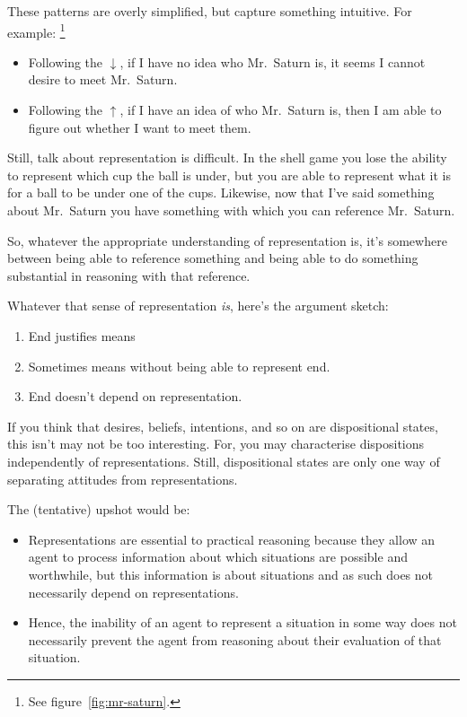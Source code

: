 \documentclass[10pt]{article}
\newcommand{\hozlinedash}[0]{%
  \noindent\hdashrule[0.5ex][c]{\textwidth}{.1pt}{2.5pt}
}
\begin{document}
These patterns are overly simplified, but capture something intuitive.
For example:\nolinebreak
\footnote{See figure~\ref{fig:mr-saturn}.}
\begin{itemize}
\item Following the \(\downarrow\), if I have no idea who Mr.\ Saturn is, it seems I cannot desire to meet Mr.\ Saturn.
\item Following the \(\uparrow\), if I have an idea of who Mr.\ Saturn is, then I am able to figure out whether I want to meet them.
\end{itemize}

Still, talk about representation is difficult.
In the shell game you lose the ability to represent which cup the ball is under, but you are able to represent what it is for a ball to be under one of the cups.
Likewise, now that I've said something about Mr.\ Saturn you have something with which you can reference Mr.\ Saturn.

So, whatever the appropriate understanding of representation is, it's somewhere between being able to reference something and being able to do something substantial in reasoning with that reference.

\hozlinedash

Whatever that sense of representation \emph{is}, here's the argument sketch:

\begin{enumerate}
\item End justifies means
\item Sometimes means without being able to represent end.
\item End doesn't depend on representation.
\end{enumerate}

If you think that desires, beliefs, intentions, and so on are dispositional states, this isn't may not be too interesting.
For, you may characterise dispositions independently of representations.
Still, dispositional states are only one way of separating attitudes from representations.



The (tentative) upshot would be:

\begin{itemize}
\item Representations are essential to practical reasoning because they allow an agent to process information about which situations are possible and worthwhile, but this information is about situations and as such does not necessarily depend on representations.
\item Hence, the inability of an agent to represent a situation in some way does not necessarily prevent the agent from reasoning about their evaluation of that situation.
\end{itemize}
\end{document}
